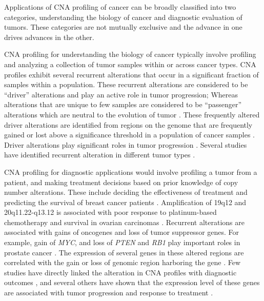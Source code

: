 Applications of CNA profiling of cancer can be broadly classified into
two categories, understanding the biology of cancer and diagnostic
evaluation of tumors. These categories are not mutually exclusive and the
advance in one drives advances in the other.

CNA profiling for understanding the biology of cancer typically involve
profiling and analyzing a collection of tumor samples within or across
cancer types.
%
CNA profiles exhibit several recurrent alterations that occur in a
significant fraction of samples within a population. These recurrent
alterations are considered to be ``driver'' alterations and play an
active role in tumor progression; Whereas alterations that are unique to
few samples are considered to be ``passenger'' alterations which are
neutral to the evolution of tumor \citep{bignell2010signatures,
beroukhim2010landscape}.
%
These frequently altered driver alterations are identified from regions
on the genome that are frequently gained or lost above a significance
threshold in a population of cancer samples \citep{mermel2011gistic2}.
%
Driver alterations play significant roles in tumor progression
\citep{bignell2010signatures, beroukhim2010landscape}.  Several studies
have identified recurrent alteration in different tumor types
\citep{beroukhim2007assessing,etemadmoghadam2009integrated,
weir2007characterizing,lin2008modeling}.



CNA profiling for diagnostic applications would involve profiling a
tumor from a patient, and making treatment decisions based on prior
knowledge of copy number alterations.
%
These include deciding the effectiveness of treatment and predicting the
survival of breast cancer patients
\citep{stuart2009linking,hicks2006novel}.
Amplification of 19q12 and 20q11.22-q13.12 is associated
with poor response to platinum-based chemotherapy and survival in
ovarian carcinomas \citep{etemadmoghadam2009integrated}.
%
Recurrent alterations are associated with gains of oncogenes and
loss of tumor suppressor genes. For example, gain of \emph{MYC}, and
loss of \emph{PTEN} and \emph{RB1} play important roles in prostate
cancer \citep{alexander2018utility}.
%
The expression of several genes in these altered regions are correlated
with the gain or loss of genomic region harboring the gene
\citep{pollack2002microarray,chitale2009integrated,lu2011integrated}.
%
Few studies have directly linked the alteration in CNA profiles with
diagnostic outcomes \citep{etemadmoghadam2009integrated,
bardelli2013amplification,berry2018genomic}, and several others have
shown that the expression level of these genes are associated with tumor
progression and response to treatment \citep{shattuck2008met,
gorre2001clinical,villanueva2013concurrent}.

